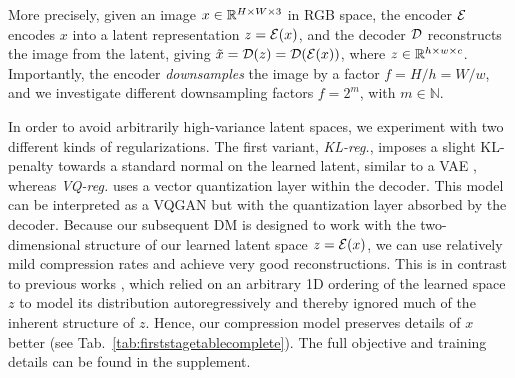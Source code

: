 \documentclass[10pt,twocolumn,letterpaper]{article}
\begin{document}
More precisely, given an image $x \in \mathbb{R}^{H \times W \times 3}$ in RGB space, 
the encoder $\mathcal{E}$ encodes $x$ into a latent representation $z=\mathcal{E}(x)$, and the decoder $\mathcal{D}$
reconstructs the image from the latent, giving $\tilde{x} = \mathcal{D}(z) = \mathcal{D}(\mathcal{E}(x))$, where $z \in \mathbb{R}^{h \times w \times c}$.
Importantly, the encoder \emph{downsamples} the image by a factor $f = H/h = W/w$, and we investigate different downsampling 
factors $f = 2^m$, with $m \in \mathbb{N}$. %


In order to avoid arbitrarily 
%
high-variance
latent spaces, we experiment with two different kinds of regularizations. The 
first variant, \emph{KL-reg.}, imposes a slight KL-penalty towards a standard
normal on the learned latent, similar to 
a VAE \cite{VAE,VAE2}, whereas \emph{VQ-reg.}
%
uses a vector quantization layer \cite{DBLP:conf/nips/OordVK17} within 
the decoder. This model can be interpreted as a VQGAN \cite{DBLP:journals/corr/abs-2012-09841} but with the quantization layer
absorbed by the decoder. %
%
%
%
%
%
Because our subsequent DM
is designed to work with the two-dimensional structure of
our learned latent space $z=\mathcal{E}(x)$, we can use relatively mild
compression rates and achieve very good reconstructions. This is in contrast to
previous works \cite{DBLP:journals/corr/abs-2012-09841,
DBLP:journals/corr/abs-2102-12092},
which relied on an arbitrary 1D ordering of the learned space $z$ to model its
distribution autoregressively and thereby ignored much of the
inherent structure of $z$.
%
%
%
%
%
Hence, our compression model preserves details of $x$ better (see Tab.~\ref{tab:firststagetablecomplete}).
The full objective and training details can be found in the supplement.

%
%

%
%
%
%

%
%
%
%
%
%
%


%
%
%
%
%
%
%
%
%
%
%
%
%
%
%
%
%
%
%

%
\end{document}
